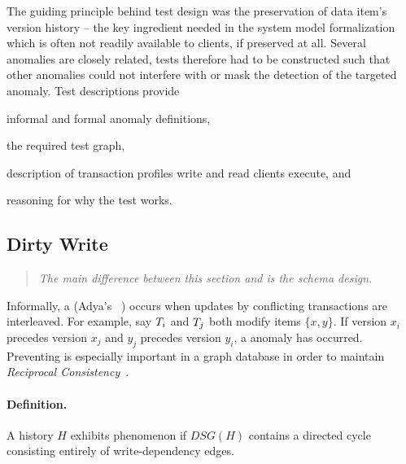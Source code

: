 The guiding principle behind test design was the preservation of data item's 
version history -- the key ingredient needed in the system model formalization 
which is often not readily available to clients, if preserved at all. Several 
anomalies are closely related, tests therefore had to be constructed such that 
other anomalies could not interfere with or mask the detection of the targeted 
anomaly. Test descriptions provide
\begin{enumerate*}[label={(\roman*)}]
  \item informal and formal anomaly definitions,
  \item the required test graph,
  \item description of transaction profiles write and read clients execute, and
  \item reasoning for why the test works.
\end{enumerate*}


\subsection{Dirty Write}
\label{sec:dirty-write}

\begin{quote}
  \textit{The main difference between this section and \ldbcsnb\xspace
          is the schema design.
  }
\end{quote}

Informally, a  (Adya's ~\cite{adya1999weak})
occurs when updates by conflicting transactions are interleaved. For example, 
say $T_i$ and $T_j$ both modify items $\{x,y\}$. If version $x_i$ 
precedes version $x_j$ and $y_j$ precedes version $y_i$, a  anomaly 
has occurred. Preventing  is especially important in a graph 
database in order to maintain \emph{Reciprocal Consistency}~\cite{Waudby2020}.

\paragraph{Definition.}
A history $H$ exhibits phenomenon  if $\textit{DSG}(H)$ contains a 
directed cycle consisting entirely of write-dependency edges.

